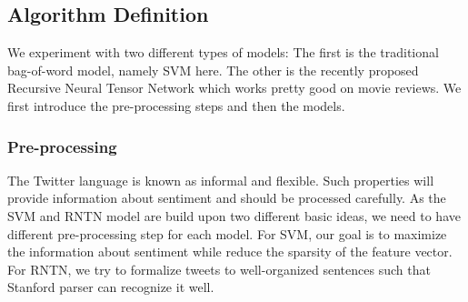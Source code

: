 \subsection{Algorithm Definition}
We experiment with two different types of models: The first is the traditional bag-of-word model, namely SVM here. The other is the recently proposed Recursive Neural Tensor Network which works pretty good on movie reviews. We first introduce the pre-processing steps and then the models. 

\subsubsection{Pre-processing}
The Twitter language is known as informal and flexible. Such properties will provide information about sentiment and should be processed carefully. As the SVM and RNTN model are build upon two different basic ideas, we need to have different pre-processing step for each model. For SVM, our goal is to maximize the information about sentiment while reduce the sparsity of the feature vector. For RNTN, we try to formalize tweets to well-organized sentences such that Stanford parser can recognize it well.

